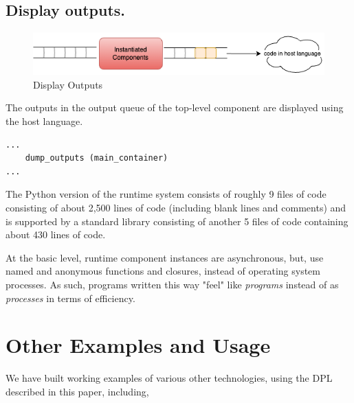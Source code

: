 \documentclass[10pt,anonymous,review]{acmart}
\begin{document}
\subsection{Display outputs.}
  \begin{figure}[h]
    \centering
    \includegraphics[scale=0.4]{./media/display.png}
    \caption{Display Outputs}
    \label{fig:display}
  \end{figure}

The outputs in the output queue of the top-level component are displayed
using the host language.

\begin{verbatim}
...
    dump_outputs (main_container)
...
\end{verbatim}
  

The Python version of the runtime system consists of roughly 9 files of
code consisting of about 2,500 lines of code (including blank lines and
comments) and is supported by a standard library consisting of another 5
files of code containing about 430 lines of code.

At the basic level, runtime component instances are asynchronous, but,
use named and anonymous functions and closures, instead of operating
system processes. As such, programs written this way "feel" like
\emph{programs} instead of as \emph{processes} in terms of efficiency.

\section{Other Examples and Usage}
We have built working examples of various other technologies, using the
DPL described in this paper, including,
\end{document}
